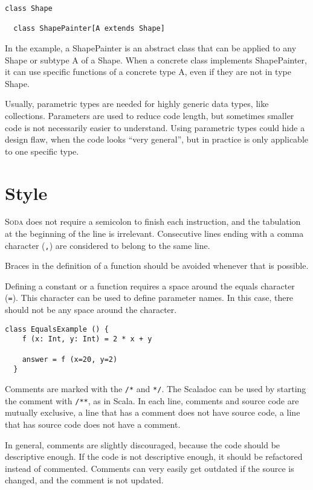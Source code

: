 \documentclass[12pt,a4paper]{book}
\newcommand{\srccode}[1]{\texttt{{#1}}}
\newcommand{\Soda}{\textsc{Soda}\xspace}
\begin{document}
    \begin{lstlisting}[label={lst:exampleUpperBoundParameter}]
  class Shape

  class ShapePainter[A extends Shape]
    \end{lstlisting}

    In the example, a ShapePainter is an abstract class that can be applied to any Shape or subtype A of a Shape.
    When a concrete class implements ShapePainter, it can use specific functions of a concrete type A, even if they are not in type Shape.

    Usually, parametric types are needed for highly generic data types, like collections.
    Parameters are used to reduce code length, but sometimes smaller code is not necessarily easier to understand.
    Using parametric types could hide a design flaw, when the code looks ``very general'', but in practice is only applicable to one specific type.


    \section{Style}

    \Soda does not require a semicolon to finish each instruction, and the tabulation at the beginning of the line is irrelevant.
    Consecutive lines ending with a comma character (\srccode{,}) are considered to belong to the same line.

    Braces in the definition of a function should be avoided whenever that is possible.

    Defining a constant or a function requires a space around the equals character (\srccode{=}).
    This character can be used to define parameter names.
    In this case, there should not be any space around the character.

    \begin{lstlisting}[label={lst:exampleFunctionWithoutBraces}]
  class EqualsExample () {
    f (x: Int, y: Int) = 2 * x + y

    answer = f (x=20, y=2)
  }
    \end{lstlisting}

    Comments are marked with the \srccode{/*} and  \srccode{*/}.
    The Scaladoc can be used by starting the comment with \srccode{/**}, as in Scala.
    In each line, comments and source code are mutually exclusive, a line that has a comment does not have source code, a line that has source code does not have a comment.

    In general, comments are slightly discouraged, because the code should be descriptive enough.
    If the code is not descriptive enough, it should be refactored instead of commented.
    Comments can very easily get outdated if the source is changed, and the comment is not updated.
\end{document}
